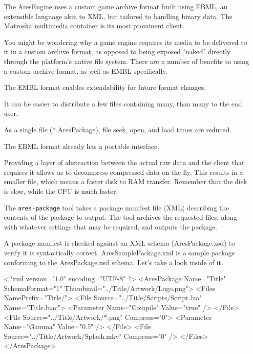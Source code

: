 


The AresEngine uses a custom game archive format built using EBML, an extensible language akin to XML, but tailored to handling binary data. The Matroska multimedia container is its most prominent client.

You might be wondering why a game engine requires its media to be delivered to it in a custom archive format, as opposed to being exposed "naked" directly through the platform's native file system. There are a number of benefits to using a custom archive format, as well as EMBL specifically.

\startitemize[4]
\item
The EMBL format enables extendability for future format changes.

\item
It can be easier to distribute a few files containing many, than many to the end user.

\item
As a single file (*.AresPackage), file seek, open, and load times are reduced.

\item
The EBML format already has a portable interface.

\item
Providing a layer of abstraction between the actual raw data and the client that requires it allows us to decompress compressed data on the fly. This results in a smaller file, which means a faster disk to RAM transfer. Remember that the disk is slow, while the CPU is much faster.
\stopitemize

The {\tt ares-package} tool takes a package manifest file (XML) describing the contents of the package to output. The tool archives the requested files, along with whatever settings that may be required, and outputs the package.

A package manifest is checked against an XML schema (AresPackage.xsd) to verify it is syntactically correct. AresSamplePackage.xml is a sample package conforming to the AresPackage.xsd schema. Let's take a look inside of it.

\startCodeExample
<?xml version="1.0" encoding="UTF-8" ?>
<AresPackage Name="Title" SchemaFormat="1" Thumbnail="../Title/Artwork/Logo.png">
    <Files NamePrefix="Title/">
        <File Source="../Title/Scripts/Script.lua" Name="Title.luac">
            <Parameter Name="Compile" Value="true" />
        </File>
        <File Source="../Title/Artwork/*.png" Compress="0">
            <Parameter Name="Gamma" Value="0.5" />
        </File>
        <File Source="../Title/Artwork/Splash.mkv" Compress="0" />
    </Files>
</AresPackage>
\stopCodeExample

